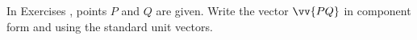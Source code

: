 {\noindent In Exercises}
{, points $P$ and $Q$ are given. Write the vector $\vv{PQ}$ in component form and using the standard unit vectors.
}
